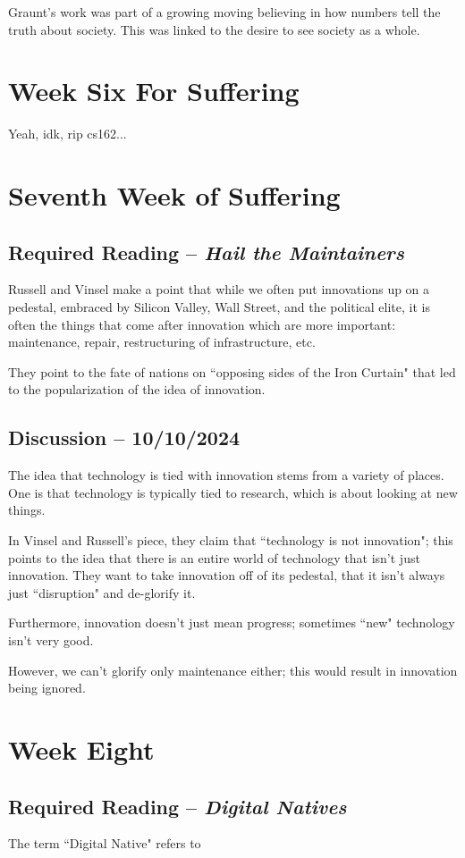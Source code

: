 \documentclass[openany]{book}
\begin{document}
Graunt's work was part of a growing moving believing in how numbers tell the truth about society. This was linked to the desire to see society as a whole.

\chapter{Week Six For Suffering}
Yeah, idk, rip cs162...

\chapter{Seventh Week of Suffering}
\section{Required Reading -- \textit{Hail the Maintainers}}
Russell and Vinsel make a point that while we often put innovations up on a pedestal, embraced by Silicon Valley, Wall Street, and the political elite, it is often the things that come after innovation which are more important: maintenance, repair, restructuring of infrastructure, etc.

They point to the fate of nations on ``opposing sides of the Iron Curtain" that led to the popularization of the idea of innovation.

\section{Discussion -- 10/10/2024}
The idea that technology is tied with innovation stems from a variety of places. One is that technology is typically tied to research, which is about looking at new things.

In Vinsel and Russell's piece, they claim that ``technology is not innovation"; this points to the idea that there is an entire world of technology that isn't just innovation. They want to take innovation off of its pedestal, that it isn't always just ``disruption" and de-glorify it.

Furthermore, innovation doesn't just mean progress; sometimes ``new" technology isn't very good.

However, we can't glorify only maintenance either; this would result in innovation being ignored.

\chapter{Week Eight}
\section{Required Reading -- \textit{Digital Natives}}
\begin{defn}
	The term ``Digital Native" refers to 
\end{defn}
\end{document}
